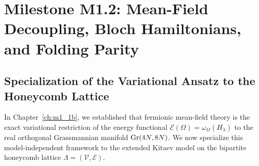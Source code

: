 \chapter{Milestone M1.2: Mean-Field Decoupling, Bloch Hamiltonians, and Folding Parity}
\label{ch:m1_2}

\section{Specialization of the Variational Ansatz to the Honeycomb Lattice}
\label{sec:m1_2_honeycomb_specialization}
In Chapter~\ref{ch:m1_1b}, we established that fermionic mean-field theory is the exact variational restriction of the energy functional $\mathcal{E}(\Omega) = \omega_\Omega(H_\lambda)$ to the real orthogonal Grassmannian manifold $\operatorname{Gr}(4N, 8N)$. We now specialize this model-independent framework to the extended Kitaev model on the bipartite honeycomb lattice $\Lambda = (\mathcal{V}, \mathcal{E})$.

